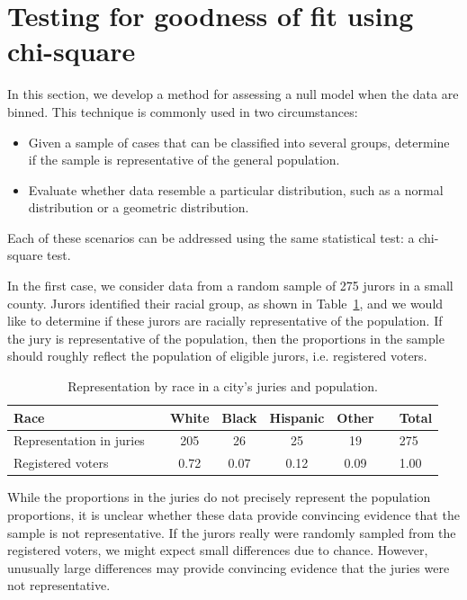 \section{Testing for goodness of fit using chi-square}
\label{oneWayChiSquare}

In this section, we develop a method for assessing a null model when the data are binned.
This technique is commonly used in two circumstances:
\begin{itemize}
\setlength{\itemsep}{0mm}
\item Given a sample of cases that can be classified into several groups, determine if the sample is representative of the general population.
\item Evaluate whether data resemble a particular distribution, such as a normal distribution or a geometric distribution.
\end{itemize}
Each of these scenarios can be addressed using the same statistical test: a chi-square test.


In the first case, we consider data from a random sample of 275 jurors in a small county. Jurors identified their racial group, as shown in Table~\ref{juryRepresentationAndCityRepresentationForRace}, and we would like to determine if these jurors are racially representative of the population. If the jury is representative of the population, then the proportions in the sample should roughly reflect the population of eligible jurors, i.e. registered voters.

\begin{table}[h]
\centering
\begin{tabular}{ll ccc c ll}
\hline
Race	 & \hspace{2mm} & White & Black & Hispanic & Other & \hspace{2mm} & Total \\
\hline
Representation in juries &	& 205 & 26 & 25 & 19 & & 275 \\
Registered voters	 & 		& 0.72 & 0.07 & 0.12 & 0.09 & & 1.00 \\
\hline
\end{tabular}
\caption{Representation by race in a city's juries and population.}
\label{juryRepresentationAndCityRepresentationForRace}
\end{table}

While the proportions in the juries do not precisely represent the population proportions, it is unclear whether these data provide convincing evidence that the sample is not representative. If the jurors really were randomly sampled from the registered voters, we might expect small differences due to chance. However, unusually large differences may provide convincing evidence that the juries were not representative.

